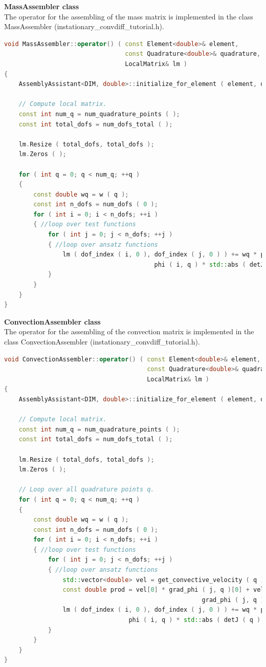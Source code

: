 \documentclass[a4paper, 11pt, twoside]{article}
\begin{document}
\textbf{MassAssembler class}\\
The operator for the assembling of the mass matrix is implemented in the class MassAssembler (instationary\_convdiff\_tutorial.h).
\begin{lstlisting}[language=C++, basicstyle={\footnotesize, \ttfamily}, keywordstyle=\color{blue}, numbers=none, tabsize=4]
void MassAssembler::operator() ( const Element<double>& element, 
                                 const Quadrature<double>& quadrature, 
                                 LocalMatrix& lm )
{
    AssemblyAssistant<DIM, double>::initialize_for_element ( element, quadrature );

    // Compute local matrix.
    const int num_q = num_quadrature_points ( );
    const int total_dofs = num_dofs_total ( );

    lm.Resize ( total_dofs, total_dofs );
    lm.Zeros ( );

    for ( int q = 0; q < num_q; ++q )
    {
        const double wq = w ( q );
        const int n_dofs = num_dofs ( 0 );
        for ( int i = 0; i < n_dofs; ++i )
        { //loop over test functions
            for ( int j = 0; j < n_dofs; ++j )
            { //loop over ansatz functions
                lm ( dof_index ( i, 0 ), dof_index ( j, 0 ) ) += wq * phi ( j, q ) * 
                                         phi ( i, q ) * std::abs ( detJ ( q ) );
            }
        }
    }
}
\end{lstlisting}

\textbf{ConvectionAssembler class}\\
The operator for the assembling of the convection matrix is implemented in the class ConvectionAssembler (instationary\_convdiff\_tutorial.h).
\begin{lstlisting}[language=C++, basicstyle={\footnotesize, \ttfamily}, keywordstyle=\color{blue}, numbers=none, tabsize=4]
void ConvectionAssembler::operator() ( const Element<double>& element, 
                                       const Quadrature<double>& quadrature, 
                                       LocalMatrix& lm )
{
    AssemblyAssistant<DIM, double>::initialize_for_element ( element, quadrature );

    // Compute local matrix.
    const int num_q = num_quadrature_points ( );
    const int total_dofs = num_dofs_total ( );

    lm.Resize ( total_dofs, total_dofs );
    lm.Zeros ( );

    // Loop over all quadrature points q.
    for ( int q = 0; q < num_q; ++q )
    {
        const double wq = w ( q );
        const int n_dofs = num_dofs ( 0 );
        for ( int i = 0; i < n_dofs; ++i )
        { //loop over test functions
            for ( int j = 0; j < n_dofs; ++j )
            { //loop over ansatz functions
                std::vector<double> vel = get_convective_velocity ( q );
                const double prod = vel[0] * grad_phi ( j, q )[0] + vel[1] * 
                                                      grad_phi ( j, q )[1];
                lm ( dof_index ( i, 0 ), dof_index ( j, 0 ) ) += wq * prod * 
                                  phi ( i, q ) * std::abs ( detJ ( q ) );
            }
        }
    }
}
\end{lstlisting}
\end{document}
